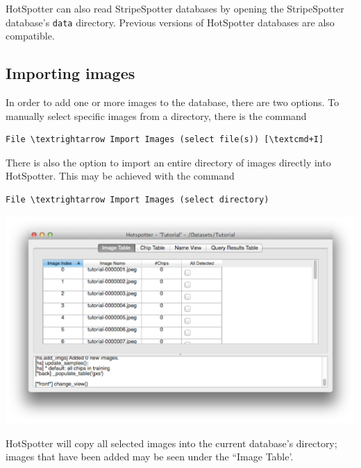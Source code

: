 \documentclass[a4paper,10pt]{article}
\begin{document}
    HotSpotter can also read StripeSpotter databases by opening the
    StripeSpotter database's {\tt data} directory.  Previous versions of HotSpotter databases
   are also compatible.
    
    \subsection{Importing images}
        In order to add one or more images to the database, there are two options. To manually select specific images from a directory, there is the command
        \begin{Verbatim}[commandchars=\\\{\}]
        File \textrightarrow Import Images (select file(s)) [\textcmd+I]
        \end{Verbatim}
        There is also the option to import an entire directory of images directly into HotSpotter.  This may be achieved with the command 
        \begin{Verbatim}[commandchars=\\\{\}]
        File \textrightarrow Import Images (select directory)
        \end{Verbatim}
        \begin{center}
            \includegraphics[scale=0.15]{images/added.png}
        \end{center}
        HotSpotter will copy all selected images into the current database's directory; images that have been added may be seen under the ``Image Table'.
\end{document}
